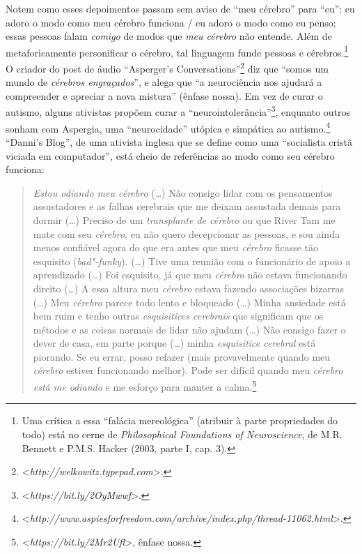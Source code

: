 Notem como esses depoimentos passam sem aviso de ``meu cérebro'' para
``eu'': eu adoro o modo como meu cérebro funciona / eu adoro o modo como
eu penso; essas pessoas falam \emph{comigo} de modos que \emph{meu
cérebro} não entende. Além de metaforicamente personificar o cérebro,
tal linguagem funde pessoas e cérebros.\footnote[22]{Uma crítica a essa ``falácia mereológica'' (atribuir à parte
propriedades do todo) está no cerne de \emph{Philosophical Foundations
of Neuroscience}, de M.R. Bennett e P.M.S. Hacker (2003, parte I, cap.
3).} O criador do
post de áudio ``Asperger's Conversations''\footnote[23]{\textless{}\emph{http://welkowitz.typepad.com}\textgreater{}.} diz que
``somos um mundo de \emph{cérebros engraçados}'', e alega que ``a
neurociência nos ajudará a compreender e apreciar a nova mistura''
(ênfase nossa). Em vez de curar o autismo, alguns ativistas propõem curar
a ``neurointolerância''\footnote[24]{\textless{}\emph{https://bit.ly/2OyMwwf}\textgreater{}.}, enquanto outros sonham com
Aspergia, uma ``neurocidade'' utópica e simpática ao
autismo.\footnote[25]{\textless{}\emph{http://www.aspiesforfreedom.com/archive/index.php/thread-11062.html}\textgreater{}.} ``Danni's Blog'', de uma ativista inglesa
que se define como uma ``socialista cristã viciada em computador'', está
cheio de referências ao modo como seu cérebro funciona:

\begin{quote}
\emph{Estou odiando meu cérebro} (\ldots{}) Não consigo lidar com os
pensamentos assustadores e as falhas cerebrais que me deixam assustada
demais para dormir (\ldots{}) Preciso de um \emph{transplante de cérebro} ou
que River Tam me mate com seu \emph{cérebro}, eu não quero decepcionar as
pessoas, e sou ainda menos confiável agora do que era antes que meu
\emph{cérebro} ficasse tão esquisito (\emph{bad"-funky}). (\ldots{}) Tive uma
reunião com o funcionário de apoio a aprendizado (\ldots{}) Foi esquisito, já
que meu \emph{cérebro} não estava funcionando direito (\ldots{}) A essa
altura meu \emph{cérebro} estava fazendo associações bizarras (\ldots{}) Meu
\emph{cérebro} parece todo lento e bloqueado (\ldots{}) Minha ansiedade está
bem ruim e tenho outras \emph{esquisitices cerebrais} que significam que
os métodos e as coisas normais de lidar não ajudam (\ldots{}) Não consigo
fazer o dever de casa, em parte porque (\ldots{}) minha \emph{esquisitice
cerebral} está piorando. Se eu errar, posso refazer (mais provavelmente
quando meu \emph{cérebro} estiver funcionando melhor). Pode ser difícil
quando meu \emph{cérebro está me odiando} e me esforço para manter a
calma.\footnote[26]{\textless{}\emph{https://bit.ly/2Mr2Ufl}\textgreater{}, ênfase nossa.}
\end{quote}

